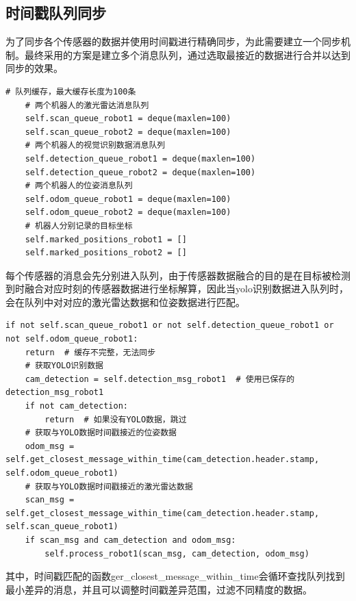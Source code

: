 \subsection{时间戳队列同步}
为了同步各个传感器的数据并使用时间戳进行精确同步，为此需要建立一个同步机制。最终采用的方案是建立多个消息队列，通过选取最接近的数据进行合并以达到同步的效果。
\begin{lstlisting}[caption={传感器消息的同步队列}]
    # 队列缓存，最大缓存长度为100条
    # 两个机器人的激光雷达消息队列
    self.scan_queue_robot1 = deque(maxlen=100)
    self.scan_queue_robot2 = deque(maxlen=100)
    # 两个机器人的视觉识别数据消息队列
    self.detection_queue_robot1 = deque(maxlen=100)
    self.detection_queue_robot2 = deque(maxlen=100)
    # 两个机器人的位姿消息队列
    self.odom_queue_robot1 = deque(maxlen=100)
    self.odom_queue_robot2 = deque(maxlen=100)
    # 机器人分别记录的目标坐标
    self.marked_positions_robot1 = []
    self.marked_positions_robot2 = []
\end{lstlisting}
每个传感器的消息会先分别进入队列，由于传感器数据融合的目的是在目标被检测到时融合对应时刻的传感器数据进行坐标解算，因此当yolo识别数据进入队列时，会在队列中对对应的激光雷达数据和位姿数据进行匹配。
\begin{lstlisting}[caption={当yolo模型检测到目标时对数据进行匹配}]
    if not self.scan_queue_robot1 or not self.detection_queue_robot1 or not self.odom_queue_robot1:
    return  # 缓存不完整，无法同步
    # 获取YOLO识别数据
    cam_detection = self.detection_msg_robot1  # 使用已保存的detection_msg_robot1
    if not cam_detection:
        return  # 如果没有YOLO数据，跳过
    # 获取与YOLO数据时间戳接近的位姿数据
    odom_msg = self.get_closest_message_within_time(cam_detection.header.stamp, self.odom_queue_robot1)
    # 获取与YOLO数据时间戳接近的激光雷达数据
    scan_msg = self.get_closest_message_within_time(cam_detection.header.stamp, self.scan_queue_robot1)
    if scan_msg and cam_detection and odom_msg:
        self.process_robot1(scan_msg, cam_detection, odom_msg)
\end{lstlisting}
其中，时间戳匹配的函数ger\_closest\_message\_within\_time会循环查找队列找到最小差异的消息，并且可以调整时间戳差异范围，过滤不同精度的数据。
